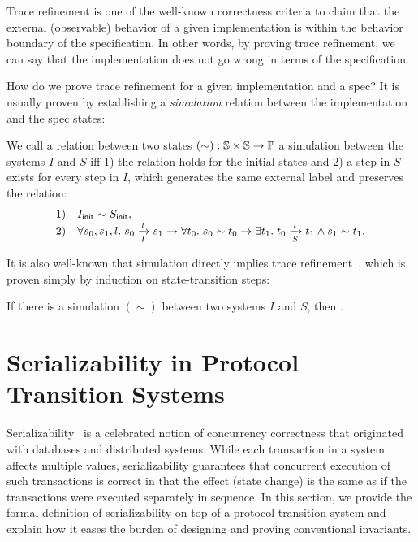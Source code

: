Trace refinement is one of the well-known correctness criteria to claim that the external (observable) behavior of a given implementation is within the behavior boundary of the specification.
In other words, by proving trace refinement, we can say that the implementation does not go wrong in terms of the specification.

How do we prove trace refinement for a given implementation and a spec?
It is usually proven by establishing a \emph{simulation} relation between the implementation and the spec states:
\begin{definition}[Simulation]
  We call a relation between two states $(\sim): \hstt{} \times \hstt{} \to \propt{}$ a simulation between the systems $I$ and $S$ iff 1) the relation holds for the initial states and 2) a step in $S$ exists for every step in $I$, which generates the same external label and preserves the relation:
  \begin{displaymath}
    \begin{array}{rl}
      1) & \sysInit{I} \sim \sysInit{S},\\
      2) & \forall s_0, s_1, l.\; \semstep{I}{s_0}{l}{s_1} \to \forall t_0.\; s_0 \sim t_0 \to \exists t_1.\; \semstep{S}{t_0}{l}{t_1} \wedge s_1 \sim t_1.
    \end{array}
  \end{displaymath}
\end{definition}

It is also well-known that simulation directly implies trace refinement~\cite{equivalence}, which is proven simply by induction on state-transition steps:
\begin{theorem}
  If there is a simulation $(\sim)$ between two systems $I$ and $S$, then .
\end{theorem}

\chapter{Serializability in Protocol Transition Systems}
\label{sec-sz-def}

Serializability~\cite{sz1,sz2} is a celebrated notion of concurrency correctness that originated with databases and distributed systems.
While each transaction in a system affects multiple values, serializability guarantees that concurrent execution of such transactions is correct in that the effect (state change) is the same as if the transactions were executed separately in sequence.
In this section, we provide the formal definition of serializability on top of a protocol transition system and explain how it eases the burden of designing and proving conventional invariants.

